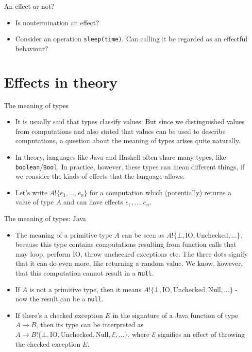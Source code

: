 \documentclass{beamer}
\newcommand{\eff}[2]{#1 ! \{ #2 \}}
\begin{document}
\begin{frame}{An effect or not?}
\begin{itemize}
	\item Is nontermination an effect?
	\item Consider an operation \texttt{sleep(time)}. Can calling it be regarded as an effectful behaviour?
\end{itemize}
\end{frame}

\section{Effects in theory}

\begin{frame}{The meaning of types}
\begin{itemize}
	\item It is usually said that types classify values. But since we distinguished values from computations and also stated that values can be used to describe computations, a question about the meaning of types arises quite naturally.
	\item In theory, languages like Java and Haskell often share many types, like \texttt{boolean}/\texttt{Bool}. In practice, however, these types can mean different things, if we consider the kinds of effects that the language allows.
	\item Let's write $\eff{A}{e_1, \dots, e_n}$ for a computation which (potentially) returns a value of type $A$ and can have effects $e_1, \dots, e_n$.
\end{itemize}
\end{frame}

\begin{frame}{The meaning of types: Java}
\begin{itemize}
	\item The meaning of a primitive type $A$ can be seen as $\eff{A}{\bot, \text{IO}, \text{Unchecked}, \dots}$, because this type contains computations resulting from function calls that may loop, perform IO, throw unchecked exceptions etc. The three dots signify that it can do even more, like returning a random value. We know, however, that this computation cannot result in a \texttt{null}.
	\item If $A$ is not a primitive type, then it means $\eff{A}{\bot, \text{IO}, \text{Unchecked}, \text{Null}, \dots}$ - now the result can be a \texttt{null}.
	\item If there's a checked exception $E$ in the signature of a Java function of type $A \to B$, then its type can be interpreted as $A \to \eff{B}{\bot, \text{IO}, \text{Unchecked}, \text{Null}, \mathcal{E}, \dots}$, where $\mathcal{E}$ signifies an effect of throwing the checked exception $E$.
\end{itemize}
\end{frame}
\end{document}
